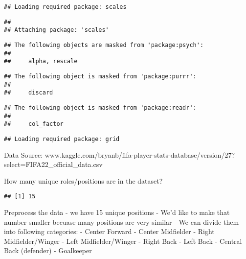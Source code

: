 \documentclass[
]{article}
\newenvironment{Shaded}{\begin{snugshade}}{\end{snugshade}}
\newcommand{\AttributeTok}[1]{\textcolor[rgb]{0.77,0.63,0.00}{#1}}
\newcommand{\FunctionTok}[1]{\textcolor[rgb]{0.00,0.00,0.00}{#1}}
\newcommand{\NormalTok}[1]{#1}
\newcommand{\SpecialCharTok}[1]{\textcolor[rgb]{0.00,0.00,0.00}{#1}}
\newcommand{\StringTok}[1]{\textcolor[rgb]{0.31,0.60,0.02}{#1}}
\begin{document}
\begin{verbatim}
## Loading required package: scales
\end{verbatim}

\begin{verbatim}
## 
## Attaching package: 'scales'
\end{verbatim}

\begin{verbatim}
## The following objects are masked from 'package:psych':
## 
##     alpha, rescale
\end{verbatim}

\begin{verbatim}
## The following object is masked from 'package:purrr':
## 
##     discard
\end{verbatim}

\begin{verbatim}
## The following object is masked from 'package:readr':
## 
##     col_factor
\end{verbatim}

\begin{verbatim}
## Loading required package: grid
\end{verbatim}

Data Source:
www.kaggle.com/bryanb/fifa-player-stats-database/version/27?select=FIFA22\_official\_data.csv

How many unique roles/positions are in the dataset?

\begin{Shaded}
\end{Shaded}

\begin{verbatim}
## [1] 15
\end{verbatim}

Preprocess the data - we have 15 unique positions - We'd like to make
that number smaller becuase many positions are very similar - We can
divide them into following categories: - Center Forward - Center
Midfielder - Right Midfielder/Winger - Left Midfielder/Winger - Right
Back - Left Back - Central Back (defender) - Goalkeeper
\end{document}
